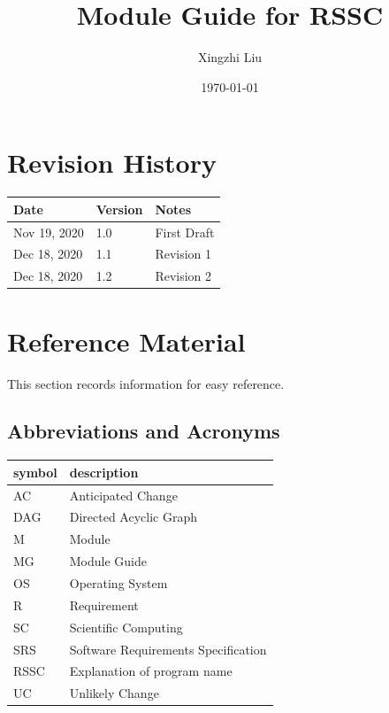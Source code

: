 \documentclass[12pt, titlepage]{article}
\begin{document}
\title{Module Guide for RSSC} 
\author{Xingzhi Liu}
\date{\today}

\maketitle


\section{Revision History}

\begin{tabularx}{\textwidth}{p{3cm}p{2cm}X}
\toprule {\bf Date} & {\bf Version} & {\bf Notes}\\
\midrule
Nov 19, 2020 & 1.0 & First Draft\\
Dec 18, 2020 & 1.1 & Revision 1\\
Dec 18, 2020 & 1.2 & Revision 2\\
\bottomrule
\end{tabularx}

\newpage

\section{Reference Material}

This section records information for easy reference.

\subsection{Abbreviations and Acronyms}

\renewcommand{\arraystretch}{1.2}
\begin{tabular}{l l} 
  \toprule		
  \textbf{symbol} & \textbf{description}\\
  \midrule 
  AC & Anticipated Change\\
  DAG & Directed Acyclic Graph \\
  M & Module \\
  MG & Module Guide \\
  OS & Operating System \\
  R & Requirement\\
  SC & Scientific Computing \\
  SRS & Software Requirements Specification\\
  RSSC & Explanation of program name\\
  UC & Unlikely Change \\
  \bottomrule
\end{tabular}\\
\end{document}
